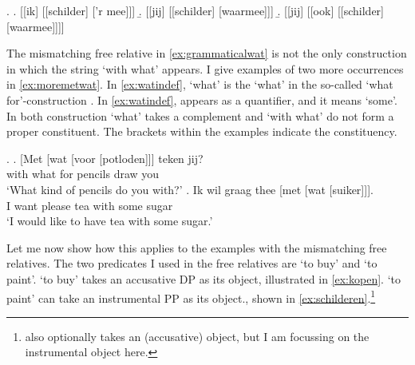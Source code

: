 \documentclass[12pt]{article}
\begin{document}
\ex.
\a. [[ik] [[schilder] ['r mee]]]\label{ex:const1stage}
\b. [[jij] [[schilder] [waarmee]]]\label{ex:const2stage}
\b. [[jij] [[ook] [[schilder] [waarmee]]]]\label{ex:const3stage}



The mismatching free relative in \ref{ex:grammaticalwat} is not the only construction in which the string  `with what' appears. I give examples of two more occurrences in \ref{ex:moremetwat}. In \ref{ex:watindef},  `what' is the  `what' in the so-called  `what for'-construction \citep[cf.][]{corver1991}.
In \ref{ex:watindef},  appears as a quantifier, and it means `some'. In both construction  `what' takes a complement and  `with what' do not form a proper constituent. The brackets within the examples indicate the constituency.

\ex.\label{ex:moremetwat}
\ag. [Met [wat [voor [potloden]]] teken jij?\\
 with what for pencils draw you\\
 `What kind of pencils do you with?'\label{ex:watwasfur}
\bg. Ik wil graag thee [met [wat [suiker]]].\\
 I want please tea with some sugar\\
 `I would like to have tea with some sugar.'\label{ex:watindef}

Let me now show how this applies to the examples with the mismatching free relatives. The two predicates I used in the free relatives are  `to buy' and   `to paint'.  `to buy' takes an accusative DP as its object, illustrated in \ref{ex:kopen}.  `to paint' can take an instrumental PP as its object., shown in \ref{ex:schilderen}.\footnote{ also optionally takes an (accusative) object, but I am focussing on the instrumental object here.}
\end{document}
